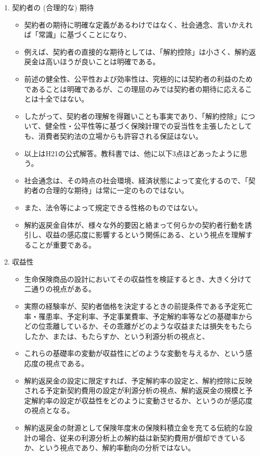 \documentclass[report,gutter=10mm,fore-edge=10mm,uplatex,dvipdfmx]{jlreq}
\begin{document}
\begin{enumerate}
\begin{itemize}
  \end{itemize}
\item 契約者の (合理的な) 期待
  \begin{itemize}
  \item 契約者の期待に明確な定義があるわけではなく、社会通念、言いかえれば「常識」に基づくことになり、
  \item 例えば、契約者の直接的な期待としては、「解約控除」は小さく、解約返戻金は高いほうが良いことは明確である。
  \item 前述の健全性、公平性および効率性は、究極的には契約者の利益のためであることは明確であるが、この理屈のみでは契約者の期待に応えることは十全ではない。
  \item したがって、契約者の理解を得難いことも事実であり、「解約控除」について、健全性・公平性等に基づく保険計理での妥当性を主張したとしても、消費者契約法の立場からも許容される保証はない。
  \item 以上はH21の公式解答。教科書では、他に以下3点ほどあったように思う。
  \item 社会通念は、その時点の社会環境、経済状態によって変化するので、「契約者の合理的な期待」は常に一定のものではない。
  \item また、法令等によって規定できる性格のものではない。
  \item 解約返戻金自体が、様々な外的要因と絡まって何らかの契約者行動を誘引し、収益の感応度に影響するという関係にある、という視点を理解することが重要である。
  \end{itemize}
\item 収益性
  \begin{itemize}
  \item 生命保険商品の設計においてその収益性を検証するとき、大きく分けて二通りの視点がある。
  \item 実際の経験率が、契約者価格を決定するときの前提条件である予定死亡率・罹患率、予定利率、予定事業費率、予定解約率等などの基礎率からどの位乖離しているか、その乖離がどのような収益または損失をもたらしたか、または、もたらすか、という利源分析の視点と、
  \item これらの基礎率の変動が収益性にどのような変動を与えるか、という感応度の視点である。
  \item 解約返戻金の設定に限定すれば、予定解約率の設定と、解約控除に反映される予定新契約費用の設定が利源分析の視点、解約返戻金の規模と予定解約率の設定が収益性をどのように変動させるか、というのが感応度の視点となる。
  \item 解約返戻金の財源として保険年度末の保険料積立金を充てる伝統的な設計の場合、従来の利源分析上の解約益は新契約費用が償却できているか、という視点であり、解約率動向の分析ではない。

\end{itemize}
\end{enumerate}
\end{document}
